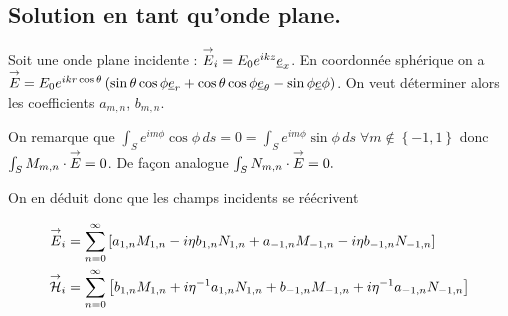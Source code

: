 \subsection{Solution en tant qu'onde plane.}

Soit une onde plane incidente : \({\overset{\rightarrow}{E}}_i = E_0 e^{ikz}\underline{e}_x\). En coordonnée sphérique on a \({\overset{\rightarrow}{E}} = E_0e^{ikr\cos\theta}\left(\sin\theta\cos\phi\underline{e}_r + \cos\theta\cos\phi\underline{e}_\theta - \sin\phi \underline{e} \phi\right)\). On veut déterminer alors les coefficients \(a_{m,n}\), \(b_{m,n}\).

On remarque que \(\int_S e^{im\phi} \cos\phi \, ds = 0 = \int_S e^{im\phi} \sin\phi \,ds\; \forall m \not \in \left\lbrace -1,1 \right\rbrace\) donc \(\int_S M_{m,n} \cdot {\overset{\rightarrow}{E}} = 0\). De façon analogue \(\int_S N_{m,n} \cdot {\overset{\rightarrow}{E}} = 0.\)

On en déduit donc que les champs incidents se réécrivent

\begin{align*}
    {\overset{\rightarrow}{E}}_i &= \sum\limits_{n=0}^\infty\left[ 
    a_{1,n}  M_{1,n} - i \eta b_{1,n} N_{1,n}
    + a_{-1,n}  M_{-1,n} - i \eta b_{-1,n} N_{-1,n}
    \right]\\
    {\overset{\rightarrow}{\mathcal{H}}}_i &= \sum\limits_{n=0}^\infty\left[
    b_{1,n}  M_{1,n} + i {\eta}^{-1} a_{1,n} N_{1,n}
    + b_{-1,n}  M_{-1,n} + i {\eta}^{-1} a_{-1,n} N_{-1,n}
    \right]
\end{align*}






